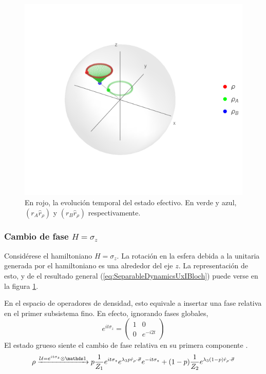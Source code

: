\begin{figure}[h!]
    \centering
    \includegraphics[width=0.6\linewidth]{maxent/figures/U1xU2_H1=sz_H2=Id_z=0.9_p=0.4_sequence.png}
    \caption{En rojo, la evolución temporal del estado efectivo. En verde y azul, $(r_{A}\hat{r}_{\rho})$ y $(r_{B}\hat{r}_{\rho})$ respectivamente.}
    \label{fig:ZRot}
\end{figure}

\subsubsection{Cambio de fase $H=\sigma_{z}$}
Considérese el hamiltoniano $H=\sigma_{z}$. La rotación en la esfera debida a la unitaria generada por el hamiltoniano es una alrededor del eje $z$. La representación de esto, y de el resultado general (\ref{eq:SeparableDynamicsUxIBloch}) puede verse en la figura \ref{fig:ZRot}.


En el espacio de operadores de densidad, esto equivale a insertar una fase relativa en el primer subsistema fino. En efecto, ignorando fases globales,
\begin{equation}
    e^{it\sigma_{z}}=\begin{pmatrix}
        1&0\\0&e^{-i2t}
    \end{pmatrix}
\end{equation}
El estado grueso siente el cambio de fase relativa en su primera componente .
\begin{equation}
    \rho\xrightarrow{\mcU=e^{it\sigma_{z}}\otimes \Id} p\frac{1}{Z_{1}}e^{it\sigma_{z}}e^{\lambda_{3}p\hat{r}_{\rho}\cdot\vec{\sigma}}e^{-it\sigma_{z}}+(1-p)\frac{1}{Z_{2}}e^{\lambda_{3}(1-p)\hat{r}_{\rho}\cdot\vec{\sigma}}
\end{equation}

